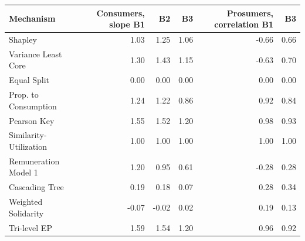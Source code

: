 \begin{tabular}{lrrrrr}
\toprule
Mechanism & Consumers, slope B1 & B2 & B3 & Prosumers, correlation B1 & B3 \\
\midrule
Shapley & 1.03 & 1.25 & 1.06 & -0.66 & 0.66 \\
Variance Least Core & 1.30 & 1.43 & 1.15 & -0.63 & 0.70 \\
Equal Split & 0.00 & 0.00 & 0.00 & 0.00 & 0.00 \\
Prop. to Consumption & 1.24 & 1.22 & 0.86 & 0.92 & 0.84 \\
Pearson Key & 1.55 & 1.52 & 1.20 & 0.98 & 0.93 \\
Similarity-Utilization & 1.00 & 1.00 & 1.00 & 1.00 & 1.00 \\
Remuneration Model 1 & 1.20 & 0.95 & 0.61 & -0.28 & 0.28 \\
Cascading Tree & 0.19 & 0.18 & 0.07 & 0.28 & 0.34 \\
Weighted Solidarity & -0.07 & -0.02 & 0.02 & 0.19 & 0.13 \\
Tri-level EP & 1.59 & 1.54 & 1.20 & 0.96 & 0.92 \\
\bottomrule
\end{tabular}
